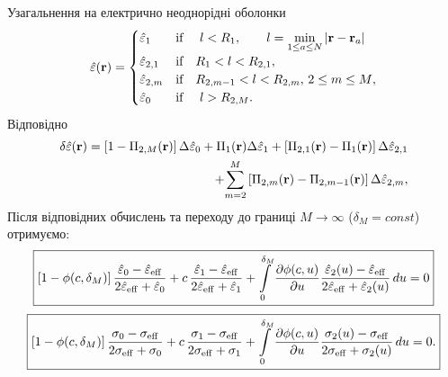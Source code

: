 \documentclass[10pt]{beamer}
\begin{document}
\begin{frame}{Узагальнення на електрично неоднорідні оболонки}
\begin{equation*} 
\hat{\varepsilon}({\bf r})=\begin{cases}
\hat{\varepsilon}_1 & {\text{if} } \quad \,\,l<R_1, \qquad l=\min\limits_{1 \leq a \leq N} |{\bf r} - {\bf r}_a| \\
\hat{\varepsilon}_{2,1} & {\text{if} }\quad  R_1<l<R_{2,1},\\
{\hat{\varepsilon}_{2,m}} & \text{if} \quad { R_{2,m-1}<l<R_{2,m}, \,2 \leq m \leq M},\\
\hat{\varepsilon}_0 & {\text{if} }\quad \,\, l>R_{2,M}.
\end{cases} \label{distr1}
\end{equation*}
Відповідно
\begin{equation}
\begin{split}
\delta\hat{\varepsilon} ({\bf r}) = \left[1- \Pi_{2,M}({\bf
r})\right] \Delta\hat{\varepsilon}_0
+ \Pi_1({\bf r}) \Delta\hat{\varepsilon}_1
+  \left[\Pi_{2,1}({\bf r})
-\Pi_1({\bf r})  \right] \Delta\hat{\varepsilon}_{2,1} \\
+ {\sum\limits_{m=2}^M  \left[ \Pi_{2,m}({\bf r}) -
\Pi_{2,m-1}({\bf r}) \right] \Delta\hat{\varepsilon}_{2,m}},
\end{split}
\end{equation}
Після відповідних обчислень та переходу до границі $M \to \infty$ ($\delta_M = const$)  отримуємо:
\begin{equation}\label{eq:nonuniformshell}
\boxed{
\left[1-\phi(c, \delta_M)\right]\frac{\hat{\varepsilon}_0
-\hat{\varepsilon}_{\rm eff}}{2\hat{\varepsilon} _{\rm
eff}+\hat{\varepsilon}_0}+ c\,\frac{\hat{\varepsilon}_1
-\hat{\varepsilon}_{\rm eff}}{2\hat{\varepsilon}_{\rm
eff}+\hat{\varepsilon}_1}
+\int\limits_0^{\delta_M}\frac{\partial \phi(c,u)}{\partial
u}\frac{\hat{\varepsilon}_2 (u) -\hat{\varepsilon}_{\rm
eff}}{2\hat{\varepsilon}_{\rm eff}+\hat{\varepsilon}_2 (u)}\,du
=0
}
\end{equation}
\begin{equation}\label{eq:nonuniformconductivity}
\boxed{
\left[1-\phi(c, \delta_M)\right]\frac{\sigma_0 -\sigma_{\rm
eff}}{2\sigma _{\rm eff}+\sigma_0}+ c\,\frac{\sigma_1 -\sigma_{\rm
eff}}{2\sigma_{\rm eff}+\sigma_1} 
+\int\limits_0^{\delta_M}\frac{\partial \phi(c,u)}{\partial
u}\frac{\sigma_2 (u) -\sigma_{\rm eff}}{2\sigma_{\rm eff}+\sigma_2
(u)}\,du =0.
}
\end{equation}

\end{frame}

\end{document}
